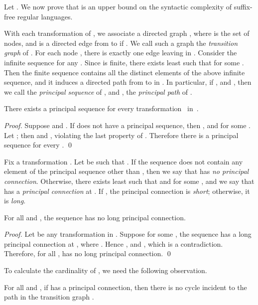 \documentclass{llncs}
\begin{document}
Let . We now prove that  is an upper bound  on the syntactic complexity of suffix-free regular languages. 

With each transformation  of , we associate a directed graph , where  is the set of nodes, and  is a directed edge from  to  if . We call such a graph  the {\em transition graph} of . For each node , there is exactly one edge leaving  in . Consider the infinite sequence  for any . Since  is finite, there exists least  such that  for some . Then the finite sequence  contains all the distinct elements of the above infinite sequence, and it induces a directed path  from  to  in . In particular, if , and , then we call  the {\em principal sequence} of , and , the {\em principal path} of . 
\begin{proposition}\label{prop:ppsf} 
There exists a principal sequence for every transformation~ in~. 
\end{proposition}

\begin{proof} 
Suppose  and . 
If  does not have a principal sequence, 
then , and  for some .
Let ; then  and , violating the last property of .
Therefore there is a principal sequence for every . \qed
\end{proof}

Fix a transformation . Let  be such that . If the sequence  does not contain any element of the principal sequence  other than , then we say that  has {\em no principal connection}. Otherwise, there exists least  such that  and  for some , and we say that  has a {\em principal connection} at . If , the  principal connection is {\em short}; otherwise, it is {\em long}. 

\begin{lemma}\label{lem:shortpath} 
For all  and , the sequence  has no long principal connection.
\end{lemma}

\begin{proof} 
Let  be any transformation in . Suppose for some , the sequence  has a long principal connection at , where . Hence , and , which is a contradiction. Therefore, for all ,  has no long principal connection. \qed
\end{proof}


To calculate the cardinality of , we need the following observation. 
\begin{lemma}\label{lem:ptree} 

For all  and , if  has a principal connection, then there is no cycle incident to the path  in the transition graph . 

\end{lemma}
\end{document}
